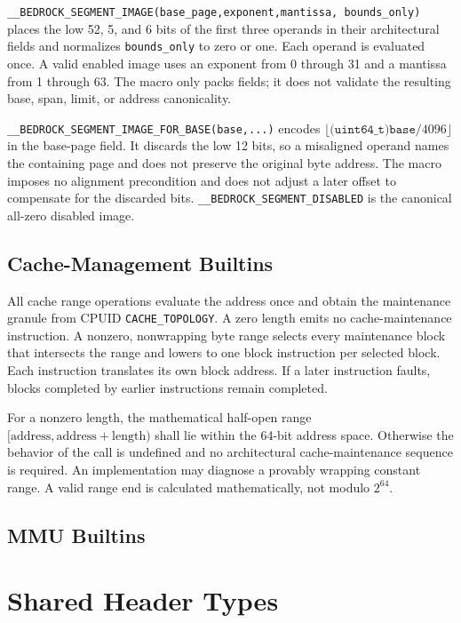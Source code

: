 \documentclass[10pt,twoside]{article}
\begin{document}
\texttt{\_\_BEDROCK\_SEGMENT\_IMAGE(base\_page,exponent,mantissa,
bounds\_only)} places the low 52, 5, and 6 bits of the first three operands in
their architectural fields and normalizes \texttt{bounds\_only} to zero or
one. Each operand is evaluated once. A valid enabled image uses an exponent
from 0 through 31 and a mantissa from 1 through 63. The macro only packs
fields; it does not validate the resulting base, span, limit, or address
canonicality.

\texttt{\_\_BEDROCK\_SEGMENT\_IMAGE\_FOR\_BASE(base,...)} encodes
$\lfloor\texttt{(uint64\_t)base}/4096\rfloor$ in the base-page field. It
discards the low 12 bits, so a misaligned operand names the containing page and
does not preserve the original byte address. The macro imposes no alignment
precondition and does not adjust a later offset to compensate for the discarded
bits. \texttt{\_\_BEDROCK\_SEGMENT\_DISABLED} is the canonical all-zero
disabled image.

\subsection{Cache-Management Builtins}
All cache range operations evaluate the address once and obtain the maintenance granule from CPUID
\texttt{CACHE\_TOPOLOGY}. A zero length emits no cache-maintenance instruction. A nonzero, nonwrapping byte range
selects every maintenance block that intersects the range and lowers to one block instruction per selected block.
Each instruction translates its own block address. If a later instruction faults, blocks completed by earlier
instructions remain completed.

For a nonzero length, the mathematical half-open range
$[\mathrm{address},\mathrm{address}+\mathrm{length})$ shall lie within the
64-bit address space. Otherwise the behavior of the call is undefined and no
architectural cache-maintenance sequence is required. An implementation may
diagnose a provably wrapping constant range. A valid range end is calculated
mathematically, not modulo $2^{64}$.


\subsection{MMU Builtins}

\section{Shared Header Types}\label{page:shared-header-types}
\BedrockGeneratedInterfaceTypes{}
\end{document}
